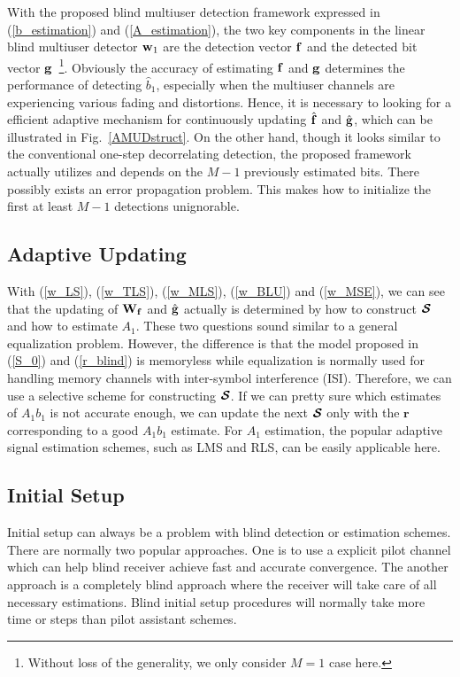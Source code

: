 \documentclass[a4paper,11pt,fleqn]{article}
\newcommand{\br}{{\mathbf r}}
\newcommand{\bg}{{\bf g}}
\newcommand{\bw}{{\bf w}}
\newcommand{\bbf}{{\bf f}}
\newcommand{\bW}{{\bf W}}
\newcommand{\bcS}{{\mbox {\boldmath ${\cal S}$}}}
\begin{document}
With the proposed blind multiuser detection framework expressed in
(\ref{b_estimation}) and (\ref{A_estimation}), the two key
components in the linear blind multiuser detector $\bw_{1}$ are
the detection vector $\bbf$ and the detected bit vector
$\bg$~\footnote{Without loss of the generality, we only consider
$M=1$ case here. }. Obviously the accuracy of estimating $\bbf$
and $\bg$ determines the performance of detecting $\hat{b}_1$,
especially when the multiuser channels are experiencing various
fading and distortions. Hence, it is necessary to looking for a
efficient adaptive mechanism for continuously updating
$\hat{\bbf}$ and $\hat{\bg}$, which can be illustrated in
Fig.~\ref{AMUDstruct}. On the other hand, though it looks similar
to the conventional one-step decorrelating detection, the proposed
framework actually utilizes and depends on the $M-1$ previously
estimated bits. There possibly exists an error propagation
problem. This makes how to initialize the first at least $M-1$
detections unignorable.

\subsection{Adaptive Updating}

With (\ref{w_LS}), (\ref{w_TLS}), (\ref{w_MLS}), (\ref{w_BLU}) and
(\ref{w_MSE}), we can see that the updating of $\bW_{\bbf}$ and
$\hat{\bg}$ actually is determined by how to construct $\bcS$ and
how to estimate $A_1$. These two questions sound similar to a
general equalization problem. However, the difference is that the
model proposed in (\ref{S_0}) and (\ref{r_blind}) is memoryless
while equalization is normally used for handling memory channels
with inter-symbol interference (ISI). Therefore, we can use a
selective scheme for constructing $\bcS$. If we can pretty sure
which estimates of $A_1b_1$ is not accurate enough, we can update
the next $\bcS$ only with the $\br$ corresponding to a good
$A_1b_1$ estimate. For $A_1$ estimation, the popular adaptive
signal estimation schemes, such as LMS and RLS, can be easily
applicable here.


\subsection{Initial Setup}

Initial setup can always be a problem with blind detection or
estimation schemes. There are normally two popular approaches. One
is to use a explicit pilot channel which can help blind receiver
achieve fast and accurate convergence. The another approach is a
completely blind approach where the receiver will take care of all
necessary estimations. Blind initial setup procedures will
normally take more time or steps than pilot assistant schemes.
\end{document}
